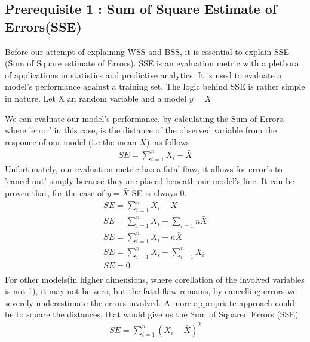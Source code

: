 \documentclass[12pt]{article}
\begin{document}
			\subsection*{Prerequisite 1 : Sum of Square Estimate of Errors(SSE)}
				Before our attempt of explaining WSS and BSS, it is essential to explain SSE (Sum of Square estimate of Errors). SSE is an evaluation metric with a plethora of applications in statistics and predictive analytics\cite{???}. It is used to evaluate a model's performance against a training set\cite{???}. The logic behind SSE is rather simple in nature. Let X an random variable and a model $y=\bar{X}$
				\begin{center}
				\end{center}
				We can evaluate our model's performance, by calculating the Sum of Errors, where 'error' in this case, is the distance of the observed variable from the responce of our model (i.e the mean $\bar{X}$), as follows
				\begin{align}
					SE = \sum_{i=1}^{n}{X_i-\bar{X}}
				\end{align}
				Unfortunately, our evaluation metric has a fatal flaw, it allows for error's to 'cancel out' simply because they are placed beneath our model's line. It can be proven that, for the case of $y=\bar{X}$ SE is always 0.
				\begin{align}
					SE = \sum_{i=1}^{n}{X_i-\bar{X}} \\
					SE = \sum_{i=1}^{n}{X_i} - \sum_{i=1}{n}{\bar{X}} \\
					SE = \sum_{i=1}^{n}{X_i} - n\bar{X} \\
					SE = \sum_{i=1}^{n}{X_i} - \sum_{i=1}^{n}{X_i} \\
					SE = 0 \\
				\end{align}
				For other models(in higher dimensions, where corellation of the involved variables is not 1), it may not be zero, but the fatal flaw remains, by cancelling errors we severely underestimate the errors involved. A more appropriate approach could be to square the distances, that would give us the Sum of Squared Errors (SSE)
				\begin{align}
					SE = \sum_{i=1}^{n}{(X_i-\bar{X})}^2
				\end{align}
\end{document}
